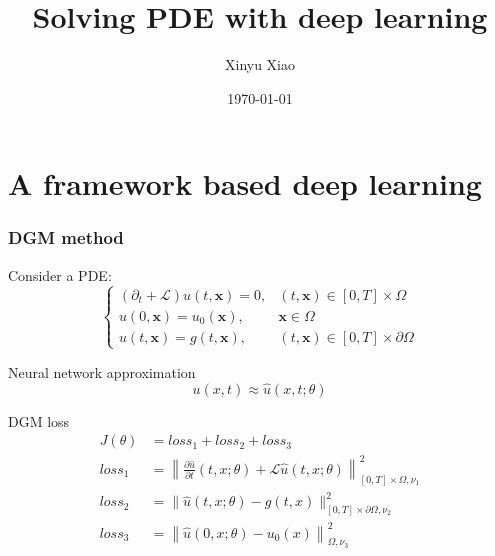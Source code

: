 \documentclass[8pt,aspectratio=15,mathserif]{beamer}
\title[Work Summary]{Solving PDE with deep learning}
\author[Xinyu Xiao]{Xinyu Xiao} %
\institute[PKU]{Peking University} %
\date{\today}  %
\begin{document}
\begin{frame}
    \titlepage
\end{frame}



\section{A framework based deep learning}
\begin{frame}
\frametitle{DGM method \cite{DGM}}
Consider a PDE:
$$
\left\{\begin{array}{ll}
\left(\partial_{t}+\mathcal{L}\right) u(t, \boldsymbol{x})=0, & (t, \boldsymbol{x}) \in[0, T] \times \Omega \\
u(0, \boldsymbol{x})=u_{0}(\boldsymbol{x}), & \boldsymbol{x} \in \Omega \\
u(t, \boldsymbol{x})=g(t, \boldsymbol{x}), & (t, \boldsymbol{x}) \in[0, T] \times \partial \Omega
\end{array}\right.
$$
\begin{block}{Neural network approximation}
$$
u(x,t) \approx \hat{u}(x,t;\theta)
$$
\end{block}
\begin{block}{DGM loss}
\begin{align*}
J(\theta) &= loss_1 + loss_2 + loss_3 \\
loss_1 &= \left\|\frac{\partial \hat{u}}{\partial t}(t, x ; \theta) + \mathcal{L} \hat{u}(t, x ; \theta)\right\|_{[0, T] \times \Omega, \nu_{1}}^{2} \\
loss_2 &= \|\hat{u}(t, x ; \theta)-g(t, x)\|_{[0, T] \times \partial \Omega, \nu_{2}}^{2}\\
loss_3 &= \left\|\hat{u}(0, x ; \theta)-u_{0}(x)\right\|_{\Omega, \nu_{3}}^{2}
\end{align*}
\end{block}
\end{frame}
\end{document}
